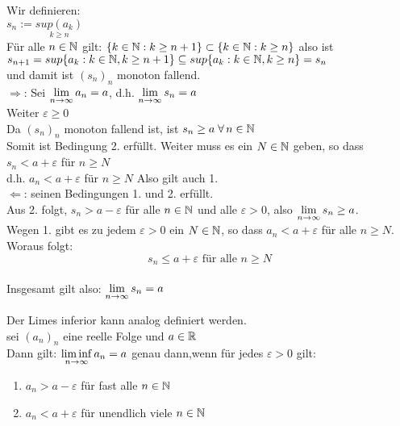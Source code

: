 \documentclass[../ana1u.tex]{subfiles}
\begin{document}
\begin{bew}
    Wir definieren:\\
    \(s_n := \underset{k \geq n}{sup(a_k)}\)\\
    Für alle \(n \in \mathbb{N}\) gilt: \(\{k \in \mathbb{N}: k \geq n+1\} \subset \{k \in \mathbb{N}: k \geq n\}\) also ist\\
    \(s_{n+1} = sup\{a_k: k \in \mathbb{N}, k \geq n+1\} \subseteq sup\{a_k: k \in \mathbb{N}, k \geq n\} = s_n\)\\
    und damit ist \((s_n)_n\) monoton fallend.\\
    \(\Rightarrow\): Sei \(\lim\limits_{n\rightarrow\infty} a_n = a\), d.h. \(\lim\limits_{n\rightarrow\infty} s_n = a\)\\
    Weiter \(\varepsilon \geq 0\)\\
    Da \((s_n)_n\) monoton fallend ist, ist \(s_n \geq a \; \forall \, n \in \mathbb{N}\)\\
    Somit ist Bedingung 2. erfüllt. Weiter muss es ein \(N \in \mathbb{N}\) geben, so dass \(s_n < a + \varepsilon\) für \(n \geq N\)\\
    d.h. \(a_n < a + \varepsilon\) für \(n \geq N\) Also gilt auch 1.\\
    \(\Leftarrow\): seinen Bedingungen 1. und 2. erfüllt.\\
    Aus 2. folgt, \(s_n > a - \varepsilon\) für alle \(n \in \mathbb{N}\) und alle \(\varepsilon > 0\), also \(\lim\limits_{n\rightarrow\infty} s_n \geq a\).\\
    Wegen 1. gibt es zu jedem \(\varepsilon > 0\) ein \(N \in \mathbb{N}\), so dass \(a_n < a + \varepsilon\) für alle \(n \geq N\).\\
    Woraus folgt:\\
    \[s_n \leq a + \varepsilon \text{ für alle } n \geq N\]\\
    Insgesamt gilt also: \(\lim\limits_{n\rightarrow\infty} s_n = a\)\\
\end{bew}
\begin{bem}
    Der Limes inferior kann analog definiert werden.\\
    sei \((a_n)_n\) eine reelle Folge und \(a \in \mathbb{R}\)\\
    Dann gilt: \(\liminf\limits_{n\rightarrow\infty} a_n = a\) genau dann,wenn für jedes \(\varepsilon > 0\) gilt:
    \begin{enumerate}
        \item \(a_n > a - \varepsilon\) für fast alle \(n \in \mathbb{N}\)
        \item \(a_n < a + \varepsilon\) für unendlich viele \(n \in \mathbb{N}\)
    \end{enumerate}
\end{bem}
\end{document}
